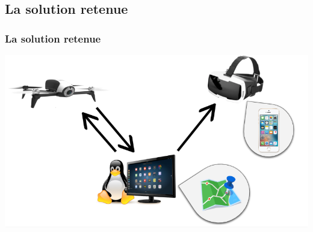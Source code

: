 \documentclass{beamer}
\begin{document}
	\begin{frame}
	\section{La solution retenue}
		\begin{center}
		\frametitle{La solution retenue}
            \includegraphics[scale=0.65]{shcema_archi.png}
		\end{center}
	\end{frame}
	
\end{document}
